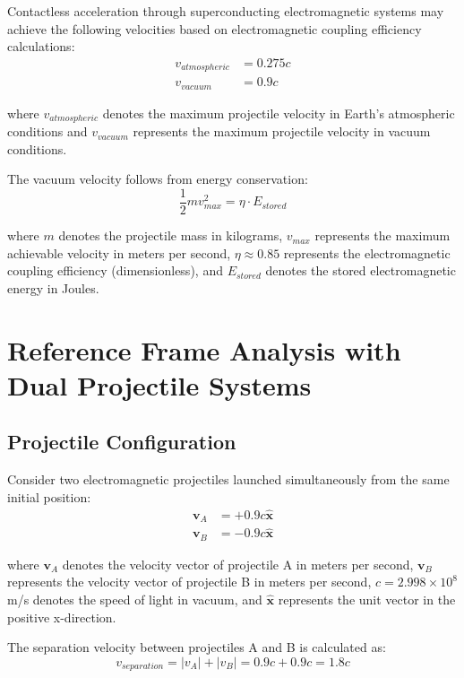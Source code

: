 \documentclass[12pt,a4paper]{article}
\begin{document}
Contactless acceleration through superconducting electromagnetic systems may achieve the following velocities based on electromagnetic coupling efficiency calculations:
\begin{align}
v_{atmospheric} &= 0.275c \\
v_{vacuum} &= 0.9c
\end{align}

where $v_{atmospheric}$ denotes the maximum projectile velocity in Earth's atmospheric conditions and $v_{vacuum}$ represents the maximum projectile velocity in vacuum conditions.

The vacuum velocity follows from energy conservation:
\begin{equation}
\frac{1}{2}mv_{max}^2 = \eta \cdot E_{stored}
\end{equation}

where $m$ denotes the projectile mass in kilograms, $v_{max}$ represents the maximum achievable velocity in meters per second, $\eta \approx 0.85$ represents the electromagnetic coupling efficiency (dimensionless), and $E_{stored}$ denotes the stored electromagnetic energy in Joules.

\section{Reference Frame Analysis with Dual Projectile Systems}

\subsection{Projectile Configuration}

Consider two electromagnetic projectiles launched simultaneously from the same initial position:
\begin{align}
\mathbf{v}_A &= +0.9c\hat{\mathbf{x}} \\
\mathbf{v}_B &= -0.9c\hat{\mathbf{x}}
\end{align}

where $\mathbf{v}_A$ denotes the velocity vector of projectile A in meters per second, $\mathbf{v}_B$ represents the velocity vector of projectile B in meters per second, $c = 2.998 \times 10^8$ m/s denotes the speed of light in vacuum, and $\hat{\mathbf{x}}$ represents the unit vector in the positive x-direction.

The separation velocity between projectiles A and B is calculated as:
\begin{equation}
v_{separation} = |v_A| + |v_B| = 0.9c + 0.9c = 1.8c
\end{equation}
\end{document}
